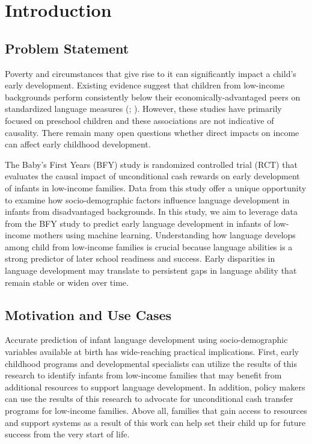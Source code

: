 \documentclass[sn-basic,pdflatex]{sn-jnl}
\begin{document}

\section{Introduction}\label{introduction}

\subsection{Problem Statement}\label{problem-statement}

Poverty and circumstances that give rise to it can significantly impact
a child's early development. Existing evidence suggest that children
from low-income backgrounds perform consistently below their
economically-advantaged peers on standardized language measures
(\citet{pace_identifying_2017}; \citet{romeo_language_2022}). However,
these studies have primarily focused on preschool children and these
associations are not indicative of causality. There remain many open
questions whether direct impacts on income can affect early childhood
development.

The Baby's First Years (BFY) study is randomized controlled trial (RCT)
that evaluates the causal impact of unconditional cash rewards on early
development of infants in low-income families. Data from this study
offer a unique opportunity to examine how socio-demographic factors
influence language development in infants from disadvantaged
backgrounds. In this study, we aim to leverage data from the BFY study
to predict early language development in infants of low-income mothers
using machine learning. Understanding how language develops among child
from low-income families is crucial because language abilities is a
strong predictor of later school readiness and success. Early
disparities in language development may translate to persistent gaps in
language ability that remain stable or widen over time.

\subsection{Motivation and Use Cases}\label{motivation-and-use-cases}

Accurate prediction of infant language development using
socio-demographic variables available at birth has wide-reaching
practical implications. First, early childhood programs and
developmental specialists can utilize the results of this research to
identify infants from low-income families that may benefit from
additional resources to support language development. In addition,
policy makers can use the results of this research to advocate for
unconditional cash transfer programs for low-income families. Above all,
families that gain access to resources and support systems as a result
of this work can help set their child up for future success from the
very start of life.
\end{document}
